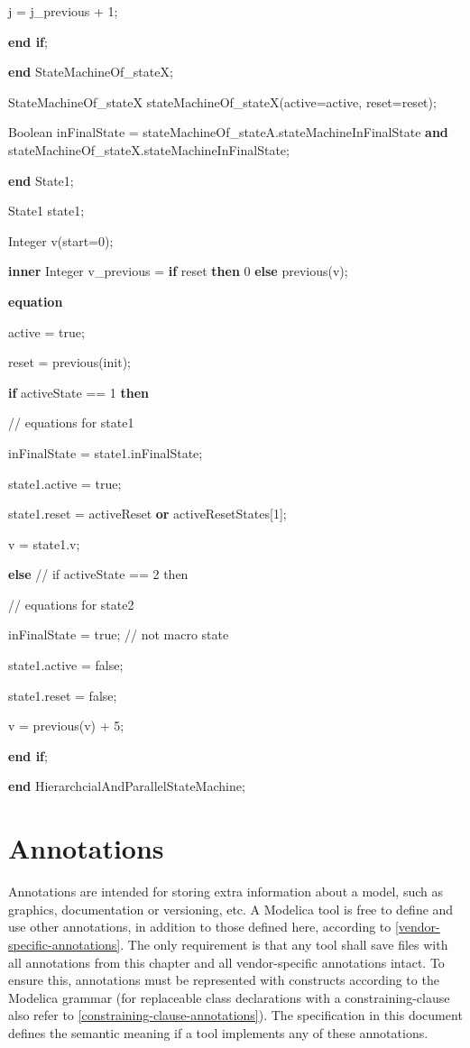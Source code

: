 \documentclass[10pt,a4paper]{report}
\def\doublelabel#1{\label{#1}\hypertarget{#1}{}}
\begin{document}
j = j\_previous + 1;

\textbf{end if};

\textbf{end} StateMachineOf\_stateX;

StateMachineOf\_stateX stateMachineOf\_stateX(active=active,
reset=reset);

Boolean inFinalState = stateMachineOf\_stateA.stateMachineInFinalState
\textbf{and\\
} stateMachineOf\_stateX.stateMachineInFinalState;

\textbf{end} State1;

State1 state1;

Integer v(start=0);

\textbf{inner} Integer v\_previous = \textbf{if} reset \textbf{then} 0
\textbf{else} previous(v);

\textbf{equation }

active = true;

reset = previous(init);

\textbf{if} activeState == 1 \textbf{then}

// equations for state1

inFinalState = state1.inFinalState;

state1.active = true;

state1.reset = activeReset \textbf{or} activeResetStates{[}1{]};

v = state1.v;

\textbf{else} // if activeState == 2 then

// equations for state2

inFinalState = true; // not macro state

state1.active = false;

state1.reset = false;

v = previous(v) + 5;

\textbf{end if};

\textbf{end} HierarchcialAndParallelStateMachine;

\chapter{Annotations}\doublelabel{annotations}

Annotations are intended for storing extra information about a model,
such as graphics, documentation or versioning, etc. A Modelica tool is
free to define and use other annotations, in addition to those defined
here, according to \ref{vendor-specific-annotations}. The only requirement is that any tool
shall save files with all annotations from this chapter and all
vendor-specific annotations intact. To ensure this, annotations must be
represented with constructs according to the Modelica grammar (for
replaceable class declarations with a constraining-clause also refer to
\ref{constraining-clause-annotations}). The specification in this document defines the
semantic meaning if a tool implements any of these annotations.
\end{document}
